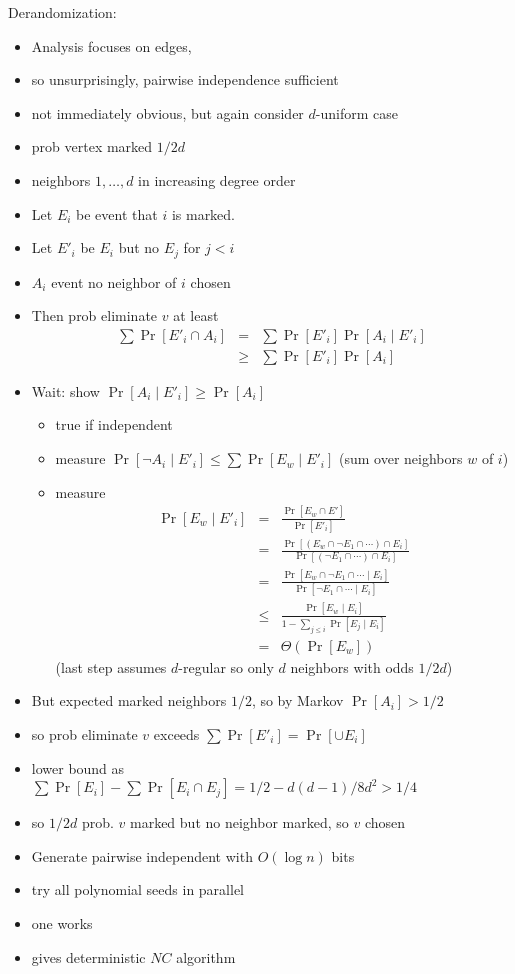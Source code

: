\documentclass[12pt]{article}
\begin{document}
Derandomization:
\begin{itemize}
\item Analysis focuses on edges, 
\item so unsurprisingly, pairwise independence sufficient
\item not immediately obvious, but again consider $d$-uniform case
\item prob vertex marked $1/2d$
\item neighbors $1,\ldots,d$ in increasing degree order
\item Let $E_i$ be event that $i$ is marked. 
\item Let $E'_i$ be $E_i$ but no $E_j$ for $j<i$
\item $A_i$ event no neighbor of $i$ chosen
\item Then prob eliminate $v$ at least 
\begin{eqnarray*}
\sum \Pr[E'_i \cap  A_i] &= &\sum\Pr[E'_i]\Pr[A_i \mid E'_i]\\
&\ge &\sum \Pr[E'_i]\Pr[A_i]
\end{eqnarray*}
\item Wait: show $\Pr[A_i \mid E'_i] \ge \Pr[A_i]$
\begin{itemize}
\item true if independent
\item measure $\Pr[\neg A_i \mid E'_i] \le \sum \Pr[E_w \mid E'_i]$
  (sum over neighbors $w$ of $i$)
\item measure 
\begin{eqnarray*}
\Pr[E_w \mid E'_i] &= &\frac{\Pr[E_w \cap E']}{\Pr[E'_i]}\\
&= &\frac{\Pr[(E_w \cap \neg E_1 \cap \cdots) \cap E_i]}{\Pr[(\neg E_1
  \cap \cdots) \cap E_i]} \\
&= &\frac{\Pr[E_w \cap \neg E_1 \cap \cdots \mid E_i]}{\Pr[\neg E_1
  \cap \cdots \mid E_i]} \\
&\le &\frac{\Pr[E_w \mid E_i]}{1-\sum_{j\le i}\Pr[E_j \mid E_i]}\\
&= &\Theta(\Pr[E_w])
\end{eqnarray*}
(last step assumes $d$-regular so only $d$ neighbors with odds $1/2d$)
\end{itemize}
\item But expected marked neighbors $1/2$, so by Markov $\Pr[A_i]>1/2$
\item so prob eliminate $v$ exceeds $\sum\Pr[E'_i]=\Pr[\cup E_i]$
\item lower bound as $\sum\Pr[E_i]-\sum\Pr[E_i \cap E_j] =
  1/2-d(d-1)/8d^2 > 1/4$
\item so $1/2d$ prob. $v$ marked but no neighbor marked, so $v$ chosen
\item Generate pairwise independent with $O(\log n)$ bits
\item try all polynomial  seeds in parallel
\item one works
\item gives deterministic $NC$ algorithm
\end{itemize}
\end{document}
